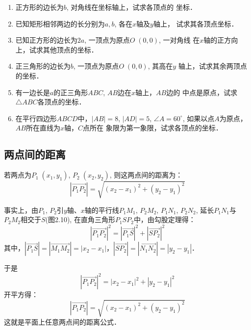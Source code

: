 \begin{ex}
\begin{enumerate}
    \item 正方形的边长为$b$, 对角线在坐标轴上，试求各顶点的
    坐标．
    \item 已知矩形相邻两边的长分别为$a,b$, 各在$x$轴及$y$轴上，
    试求其各顶点坐标．
    \item 已知正方形的边长为$2a$, 一顶点为原点$O\;(0,0)$, 一对角线
    在$x$轴的正方向上，试求其他顶点的坐标．
    \item 正三角形的边长为$b$, 一顶点为原点$O\;(0,0)$, 其高在$y$
    轴上，试求其余两顶点的坐标．
    \item 有一边长是$a$的正三角形$ABC$, $AB$边在$x$轴上，$AB$边的
    中点是原点，试求$\triangle ABC$各顶点的坐标．
    \item 在平行四边形$ABCD$中，$|AB|=8$, $|AD|=5$, $\angle A=
    60^{\circ}$, 如果以点$A$为原点，$AB$所在直线为$x$轴，$C$点所在
    象限为第一象限，试求各顶点的坐标．
\end{enumerate}
\end{ex}

\subsection{两点间的距离}
若两点为$P_1\;(x_1,y_1)$, $P_2\;(x_2,y_2)$, 则这两点间的距离为：
$$|\Vec{P_1P_2}|=\sqrt{(x_2-x_1)^2+(y_2-y_1)^2}$$

\begin{figure}[htp]
    \centering
{}
    \caption{}
\end{figure}



事实上，由$P_1$, $P_2$引$y$轴、$x$轴的平行线$P_1M_1$, $P_2M_2$,
$P_1N_1$, $P_2N_2$, 延长$P_1N_1$与$P_2M_2$相交于$S$(图2.10), 在直角三角形$P_1SP_2$中，由勾股定理得：
\[|\Vec{P_1P_2}|^2=|\Vec{P_1S}|^2+|\Vec{SP_2}|^2 \]
其中，$|\Vec{P_1S}|=|\Vec{M_1M_2}|=|x_2-x_1|$，$|\Vec{SP_2}|=|\Vec{N_1N_2}|=|y_2-y_1|$．

于是$$|\Vec{P_1P_2}|^2=|x_2-x_1|^2+|y_2-y_1|^2$$
开平方得：
$$|\Vec{P_1P_2}|=\sqrt{(x_2-x_1)^2+(y_2-y_1)^2}$$
这就是平面上任意两点间的距离公式．

